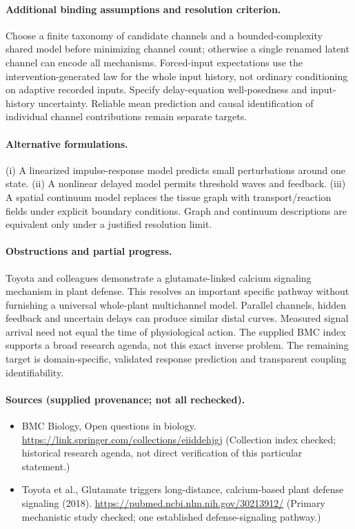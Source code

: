 \documentclass[11pt]{article}
\begin{document}
\paragraph{Additional binding assumptions and resolution criterion.} Choose a finite taxonomy of candidate channels and a bounded-complexity shared model before minimizing channel count; otherwise a single renamed latent channel can encode all mechanisms. Forced-input expectations use the intervention-generated law for the whole input history, not ordinary conditioning on adaptive recorded inputs. Specify delay-equation well-posedness and input-history uncertainty. Reliable mean prediction and causal identification of individual channel contributions remain separate targets.

\paragraph{Alternative formulations.} (i) A linearized impulse-response model predicts small perturbations around one state. (ii) A nonlinear delayed model permits threshold waves and feedback. (iii) A spatial continuum model replaces the tissue graph with transport/reaction fields under explicit boundary conditions. Graph and continuum descriptions are equivalent only under a justified resolution limit.

\paragraph{Obstructions and partial progress.} Toyota and colleagues demonstrate a glutamate-linked calcium signaling mechanism in plant defense. This resolves an important specific pathway without furnishing a universal whole-plant multichannel model. Parallel channels, hidden feedback and uncertain delays can produce similar distal curves. Measured signal arrival need not equal the time of physiological action. The supplied BMC index supports a broad research agenda, not this exact inverse problem. The remaining target is domain-specific, validated response prediction and transparent coupling identifiability.

\paragraph{Sources (supplied provenance; not all rechecked).} \begin{itemize}
\item BMC Biology, Open questions in biology. \url{https://link.springer.com/collections/eiiddehjgj} (Collection index checked; historical research agenda, not direct verification of this particular statement.)
\item Toyota et al., Glutamate triggers long-distance, calcium-based plant defense signaling (2018). \url{https://pubmed.ncbi.nlm.nih.gov/30213912/} (Primary mechanistic study checked; one established defense-signaling pathway.)
\end{itemize}
\end{document}
